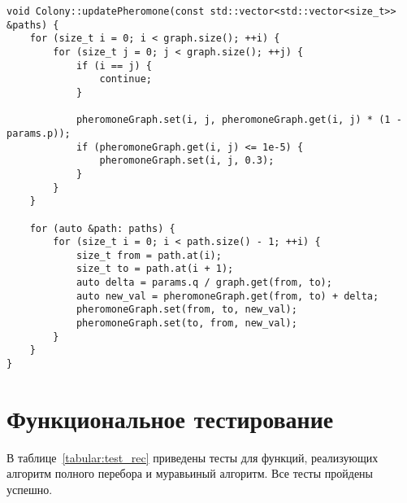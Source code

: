 \clearpage
\begin{lstlisting}[label=lst:fer,caption=обновление феромона]
void Colony::updatePheromone(const std::vector<std::vector<size_t>> &paths) {
	for (size_t i = 0; i < graph.size(); ++i) {
		for (size_t j = 0; j < graph.size(); ++j) {
			if (i == j) {
				continue;
			}
			
			pheromoneGraph.set(i, j, pheromoneGraph.get(i, j) * (1 - params.p));
			if (pheromoneGraph.get(i, j) <= 1e-5) {
				pheromoneGraph.set(i, j, 0.3);
			}
		}
	}

	for (auto &path: paths) {
		for (size_t i = 0; i < path.size() - 1; ++i) {
			size_t from = path.at(i);
			size_t to = path.at(i + 1);
			auto delta = params.q / graph.get(from, to);
			auto new_val = pheromoneGraph.get(from, to) + delta;
			pheromoneGraph.set(from, to, new_val);
			pheromoneGraph.set(to, from, new_val);
		}
	}
}
\end{lstlisting}
\clearpage


\section{Функциональное тестирование}
В таблице~\ref{tabular:test_rec} приведены тесты для функций, реализующих алгоритм полного перебора и муравьиный алгоритм.
Все тесты пройдены успешно.

